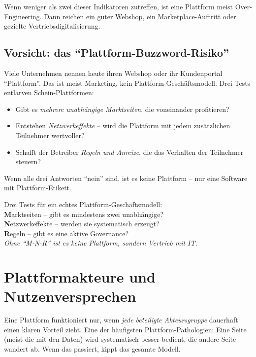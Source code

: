 \documentclass[11pt,a4paper,oneside]{article}
\newcommand{\caveatfontfallback}{\itshape}
\newcommand\caveatfont{\caveatfontfallback}%
\newcommand{\akzent}[1]{{\caveatfont\color{lpAmber}#1}}
\begin{document}
Wenn weniger als zwei dieser Indikatoren zutreffen, ist eine Plattform meist Over-Engineering. Dann reichen ein guter Webshop, ein Marketplace-Auftritt oder gezielte Vertriebsdigitalisierung.

\subsection{Vorsicht: das ``Plattform-Buzzword-Risiko''}

Viele Unternehmen nennen heute ihren Webshop oder ihr Kundenportal ``Plattform''. Das ist meist Marketing, kein Plattform-Geschäftsmodell. Drei Tests entlarven Schein-Plattformen:

\begin{itemize}
  \item Gibt es \emph{mehrere unabhängige Marktseiten}, die voneinander profitieren?
  \item Entstehen \emph{Netzwerkeffekte} -- wird die Plattform mit jedem zusätzlichen Teilnehmer wertvoller?
  \item Schafft der Betreiber \emph{Regeln und Anreize}, die das Verhalten der Teilnehmer steuern?
\end{itemize}

Wenn alle drei Antworten ``nein'' sind, ist es keine Plattform -- nur eine Software mit Plattform-Etikett.

\begin{eselsbox}[Eselsbrücke: \akzent{M-N-R}]
Drei Tests für ein echtes Plattform-Geschäftsmodell:\\[2pt]
\textbf{M}arktseiten -- gibt es mindestens zwei unabhängige?\\
\textbf{N}etzwerkeffekte -- werden sie systematisch erzeugt?\\
\textbf{R}egeln -- gibt es eine aktive Governance?\\[2pt]
\emph{Ohne ``M-N-R'' ist es keine Plattform, sondern Vertrieb mit IT.}
\end{eselsbox}

\section{Plattformakteure und Nutzenversprechen}

Eine Plattform funktioniert nur, wenn \emph{jede beteiligte Akteursgruppe} dauerhaft einen klaren Vorteil zieht. Eine der häufigsten Plattform-Pathologien: Eine Seite (meist die mit den Daten) wird systematisch besser bedient, die andere Seite wandert ab. Wenn das passiert, kippt das gesamte Modell.
\end{document}
